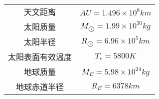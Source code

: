\begin{center}
\begin{tabular}{|c|c|}
  天文距离 & $AU = 1.496 \times 10^8 km$ \\

  太阳质量  & $M_{\bigodot} = 1.99 \times 10^{30} kg$ \\

  太阳半径 & $R_{\bigodot} = 6.96 \times 10^5 km$ \\

  太阳表面有效温度 & $T_e = 5800 K$ \\

  地球质量 & $M_E = 5.98 \times 10^{24} kg$ \\

  地球赤道半径 & $R_E = 6378 km$ \\


  \hline
\end{tabular}

\end{center}